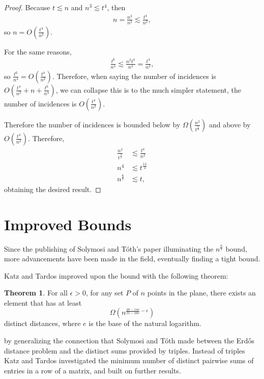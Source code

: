 \documentclass{scrippsthesisclass}
\theoremstyle{definition}
\newtheorem{theorem}{Theorem}[section]
\begin{document}
\begin{proof}
Because $t \lesssim n$ and $n^3 \lesssim t^4$, then 
\begin{align}
    n = \frac{n^3}{n^2} \lesssim \frac{t^4}{n^2}, 
\end{align}
so $n = O\left(\frac{t^4}{n^2}\right)$. 

For the same reasons,
\begin{align}
    \frac{t^6}{n^4} \lesssim \frac{n^2 t^4}{n^4}  = \frac{t^4}{n^2},
\end{align}
so $\frac{t^6}{n^4} = O\left(\frac{t^4}{n^2}\right)$.
Therefore, when saying the number of incidences is $O\left(\frac{t^4}{n^2} + n + \frac{t^6}{n^4}\right)$, we can collapse this is to the much simpler statement, the number of incidences is $O\left(\frac{t^4}{n^2}\right)$. 

Therefore the number of incidences is bounded below by $\Omega \left(\frac{n^2}{t^{\frac{2}{3}}}\right)$ and above by $O\left(\frac{t^4}{n^2}\right)$. 
Therefore, 
\begin{align}
    \frac{n^2}{t^{\frac{2}{3}}} &\lesssim \frac{t^4}{n^2}\\
    n^4 & \lesssim t^{\frac{14}{3}}\\
    n^{\frac{6}{7}} &\lesssim t, 
\end{align}
obtaining the desired result.

\end{proof}
\newpage
\section{Improved Bounds}
Since the publishing of Solymosi and T\'{o}th's paper illuminating the $n^{\frac{6}{7}}$ bound, more advancements have been made in the field, eventually finding a tight bound. 

Katz and Tardos improved upon the bound with the following theorem:
\begin{theorem}\cite{KatzTardos}
    For all $\epsilon > 0$, for any set $P$ of $n$ points in the plane, there exists an element that has at least 
    \[
    \Omega \left(n^{\frac{48 - 14e}{55 - 16e} - \epsilon}\right)
    \]
    distinct distances, where $e$ is the base of the natural logarithm. 
\end{theorem}by generalizing the connection that Solymosi and T\'{o}th made between the Erd\H{o}s distance problem and the distinct sums provided by triples. 
Instead of triples Katz and Tardos investigated the minimum number of distinct pairwise sums of entries in a row of a matrix, and built on further results. 
\end{document}
